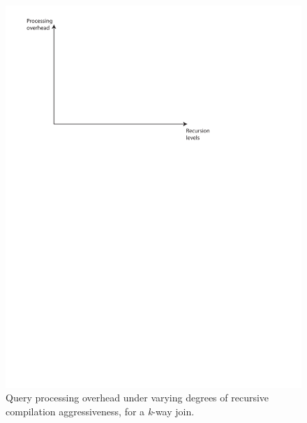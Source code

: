 \documentclass{sig-alternate}
\begin{document}
\begin{figure}
\includegraphics[scale=0.6]{figures/axes-rlevels.pdf}
\caption{Query processing overhead under varying degrees of recursive
compilation aggressiveness, for a \textit{k}-way join.}
\label{fig:overhead-recursion-levels-join}
\end{figure}
\end{document}

